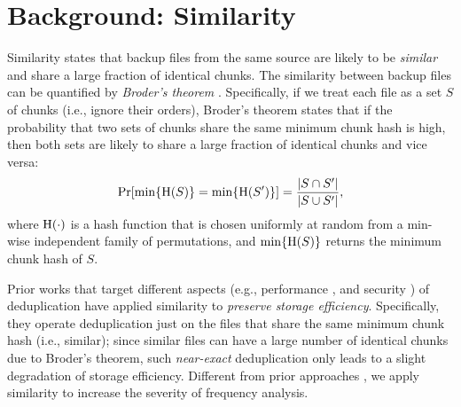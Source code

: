 \documentclass[bachelor]{thesis-uestc}
\begin{document}
\section{Background: Similarity}
\label{sec:similarity}
Similarity \cite{bhagwat09} states that backup files from the same source are likely to be {\em similar} and share a large fraction of identical chunks. The similarity between backup files can be quantified by {\em Broder's theorem} \cite{broder97}. Specifically, if we treat each file as a set $S$ of chunks (i.e., ignore their orders), Broder's theorem states that if the probability that two sets of chunks share the same minimum chunk hash is high, then both sets are likely to share a large fraction of identical chunks and vice versa:  
\begin{eqnarray}
	\Pr[\min\{{\rm H}(S)\} = \min\{{\rm H}(S')\} ] = \frac{|S \cap S'|}{|S \cup S'|}, \nonumber
	\label{eq:broder}
\end{eqnarray}
where ${\rm H}(\cdot)$ is a hash function that is chosen uniformly at random from a min-wise independent family of permutations, and $\min\{{\rm H}(S)\}$ returns the minimum chunk hash of $S$. 

Prior works that target different aspects (e.g., performance \cite{qin17,xia11,bhagwat09}, and security \cite{li17}) of deduplication  have applied similarity to {\em preserve storage efficiency}. Specifically, they operate deduplication just on the files that share the same minimum chunk hash (i.e., similar); since similar files can have a large number of identical chunks due to Broder's theorem, such {\em near-exact} deduplication only leads to a slight degradation of storage efficiency. Different from  prior approaches \cite{qin17,xia11,bhagwat09,li17}, we apply similarity to increase the severity of frequency analysis.   






\end{document}
